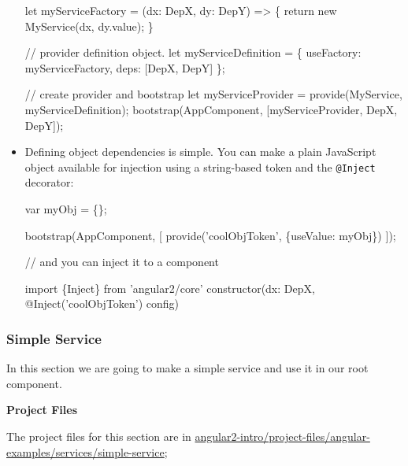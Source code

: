 \documentclass[12pt,]{article}
\newenvironment{Shaded}{}{}
\newcommand{\KeywordTok}[1]{\textcolor[rgb]{0.00,0.00,1.00}{{#1}}}
\newcommand{\CommentTok}[1]{\textcolor[rgb]{0.00,0.50,0.00}{{#1}}}
\newcommand{\FunctionTok}[1]{{#1}}
\newcommand{\NormalTok}[1]{{#1}}
\begin{document}
\begin{itemize}
\begin{Shaded}
\begin{Highlighting}[numbers=left,,]
\NormalTok{let myServiceFactory = (dx: DepX, dy: DepY) => \{}
  \KeywordTok{return} \KeywordTok{new} \FunctionTok{MyService}\NormalTok{(dx, dy.}\FunctionTok{value}\NormalTok{);}
\NormalTok{\}}

\CommentTok{// provider definition object.}
\NormalTok{let myServiceDefinition = \{}
   \NormalTok{useFactory: myServiceFactory,}
   \NormalTok{deps: [DepX, DepY]}
\NormalTok{\};}

\CommentTok{// create provider and bootstrap}
\NormalTok{let myServiceProvider = }\FunctionTok{provide}\NormalTok{(MyService, myServiceDefinition);}
\FunctionTok{bootstrap}\NormalTok{(AppComponent, [myServiceProvider, DepX, DepY]);}
\end{Highlighting}
\end{Shaded}
\item
  Defining object dependencies is simple. You can make a plain
  JavaScript object available for injection using a string-based token
  and the \texttt{@Inject} decorator:

\begin{Shaded}
\begin{Highlighting}[numbers=left,,]
\NormalTok{var myObj = \{\};}

\FunctionTok{bootstrap}\NormalTok{(AppComponent, [}
  \FunctionTok{provide}\NormalTok{('coolObjToken', \{useValue: myObj\})}
\NormalTok{]);}

\CommentTok{// and you can inject it to a component}

\KeywordTok{import} \NormalTok{\{Inject\} from 'angular2/core'}
\FunctionTok{constructor}\NormalTok{(dx: DepX, }\FunctionTok{@Inject}\NormalTok{('coolObjToken') config)}
\end{Highlighting}
\end{Shaded}
\end{itemize}

\subsubsection{Simple Service}\label{simple-service}

In this section we are going to make a simple service and use it in our
root component.

\textbf{Project Files}

The project files for this section are in
\href{https://github.com/aminmeyghani/angular2-intro/tree/master/project-files/angular-examples/services/simple-service}{angular2-intro/project-files/angular-examples/services/simple-service};
\end{document}
